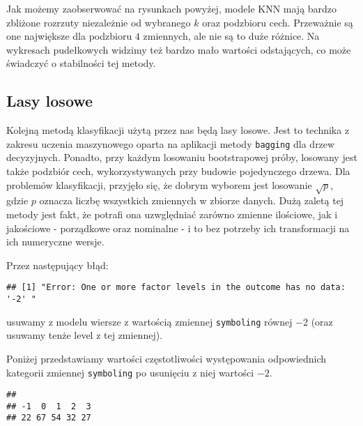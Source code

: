 \documentclass[12pt, a4paper]{article}\usepackage[]{graphicx}\usepackage[]{xcolor}
\makeatletter
\newenvironment{kframe}{%
 \def\at@end@of@kframe{}%
 \ifinner\ifhmode%
  \def\at@end@of@kframe{\end{minipage}}%
  \begin{minipage}{\columnwidth}%
 \fi\fi%
 \def\FrameCommand##1{\hskip\@totalleftmargin \hskip-\fboxsep
 \colorbox{shadecolor}{##1}\hskip-\fboxsep
     \hskip-\linewidth \hskip-\@totalleftmargin \hskip\columnwidth}%
 \MakeFramed {\advance\hsize-\width
   \@totalleftmargin\z@ \linewidth\hsize
   \@setminipage}}%
 {\par\unskip\endMakeFramed%
 \at@end@of@kframe}
\newenvironment{knitrout}{}{} %
\makeatother
\begin{document}
Jak możemy zaobserwować na rysunkach powyżej, modele KNN mają bardzo zbliżone rozrzuty niezależnie od wybranego $k$ oraz podzbioru cech. Przeważnie są one największe dla podzbioru $4$ zmiennych, ale nie są to duże różnice. Na wykresach pudełkowych widzimy też bardzo mało wartości odstających, co może świadczyć o stabilności tej metody.


\subsection{Lasy losowe}
Kolejną metodą klasyfikacji użytą przez nas będą lasy losowe. Jest to technika z zakresu uczenia maszynowego oparta na aplikacji metody \texttt{bagging} dla drzew decyzyjnych. Ponadto, przy każdym losowaniu bootstrapowej próby, losowany jest także podzbiór cech, wykorzystywanych przy budowie pojedynczego drzewa. Dla problemów klasyfikacji, przyjęło się, że dobrym wyborem jest losowanie $\sqrt p$, gdzie $p$ oznacza liczbę wszystkich zmiennych w zbiorze danych.  Dużą zaletą tej metody jest fakt, że potrafi ona uzwględniać zarówno zmienne ilościowe, jak i jakościowe - porządkowe oraz nominalne - i to bez potrzeby ich transformacji na ich numeryczne wersje. 

\par Przez następujący błąd:
\begin{knitrout}
\color{fgcolor}\begin{kframe}
\begin{verbatim}
## [1] "Error: One or more factor levels in the outcome has no data: '-2' "
\end{verbatim}
\end{kframe}
\end{knitrout}
usuwamy z modelu wiersze z wartością zmiennej \texttt{symboling} równej $-2$ (oraz usuwamy tenże level z tej zmiennej).
\par
Poniżej przedstawiamy wartości częstotliwości występowania odpowiednich kategorii zmiennej \texttt{symboling} po usunięciu z niej wartości $-2$.

\begin{knitrout}
\color{fgcolor}\begin{kframe}
\begin{verbatim}
## 
## -1  0  1  2  3 
## 22 67 54 32 27
\end{verbatim}
\end{kframe}
\end{knitrout}
\end{document}
